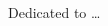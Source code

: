 

\clearpage

\begin{adjustwidth}{0.23\textwidth}{0.23\textwidth}
\begingroup
  \null\vspace{0.3\textheight}
  \Large\itshape
  \begin{center}
    Dedicated to \dots
  \end{center}
\endgroup
\end{adjustwidth}

\clearpage